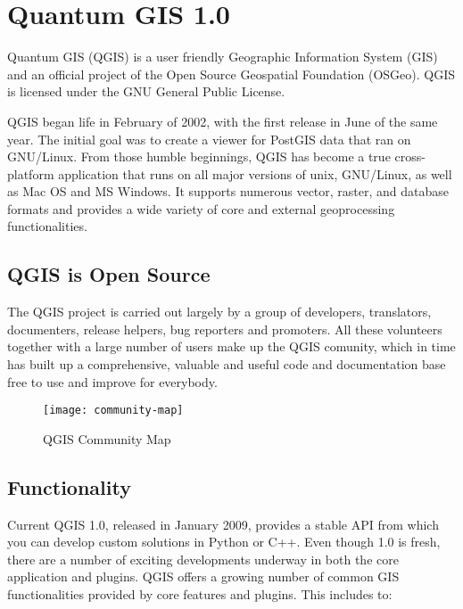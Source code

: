 \section{Quantum GIS 1.0}
\setcounter{page}{1}

Quantum GIS (QGIS) is a user friendly Geographic Information System (GIS) and
an official project of the Open Source Geospatial Foundation (OSGeo). QGIS is
licensed under the GNU General Public License.


QGIS began life in February of 2002, with the first release in June of the
same year. The initial goal was to create a viewer for PostGIS data that ran
on GNU/Linux. From those humble beginnings, QGIS has become a true
cross-platform application that runs on all major versions of unix,
GNU/Linux, as well as Mac OS and MS Windows. It supports numerous vector,
raster, and database formats and provides a wide variety of core and external
geoprocessing functionalities.

\subsection{QGIS is Open Source}

The QGIS project is carried out largely by a group of developers,
translators, documenters, release helpers, bug reporters and promoters. All
these volunteers together with a large number of users make up the QGIS
comunity, which in time has built up a comprehensive, valuable and useful
code and documentation base free to use and improve for everybody.

\begin{figure}[h]
   \begin{center}
   \caption{QGIS Community Map}\label{fig:community-map}\smallskip
   \texttt{[image: community-map]}
\end{center}
\end{figure}

\subsection{Functionality}

Current QGIS 1.0, released in January 2009, provides a stable API from which
you can develop custom solutions in Python or C++. Even though 1.0 is fresh,
there are a number of exciting developments underway in both the core
application and plugins. QGIS offers a growing number of common GIS
functionalities provided by core features and plugins. This includes to:

